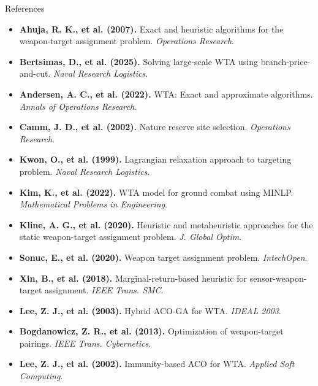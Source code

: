 \documentclass[aspectratio=169,10pt]{beamer}
\begin{document}

\begin{frame}[shrink=5]{References}
  \tiny
  \raggedright
  \begin{itemize}\setlength\itemsep{4pt}
    \item[\hypertarget{ref1}{[1]}] \textbf{Ahuja, R. K., et al. (2007).} Exact and heuristic algorithms for the weapon-target assignment problem. \textit{Operations Research}.
    \item[\hypertarget{ref2}{[2]}] \textbf{Bertsimas, D., et al. (2025).} Solving large-scale WTA using branch-price-and-cut. \textit{Naval Research Logistics}.
    \item[\hypertarget{ref3}{[3]}] \textbf{Andersen, A. C., et al. (2022).} WTA: Exact and approximate algorithms. \textit{Annals of Operations Research}.
    \item[\hypertarget{ref4}{[4]}] \textbf{Camm, J. D., et al. (2002).} Nature reserve site selection. \textit{Operations Research}.
    \item[\hypertarget{ref5}{[5]}] \textbf{Kwon, O., et al. (1999).} Lagrangian relaxation approach to targeting problem. \textit{Naval Research Logistics}.
    \item[\hypertarget{ref6}{[6]}] \textbf{Kim, K., et al. (2022).} WTA model for ground combat using MINLP. \textit{Mathematical Problems in Engineering}.
    \item[\hypertarget{ref7}{[7]}] \textbf{Kline, A. G., et al. (2020).} Heuristic and metaheuristic approaches for the static weapon-target assignment problem. \textit{J. Global Optim}.
    \item[\hypertarget{ref8}{[8]}] \textbf{Sonuc, E., et al. (2020).} Weapon target assignment problem. \textit{IntechOpen}.
    \item[\hypertarget{ref9}{[9]}] \textbf{Xin, B., et al. (2018).} Marginal-return-based heuristic for sensor-weapon-target assignment. \textit{IEEE Trans. SMC}.
    \item[\hypertarget{ref10}{[10]}] \textbf{Lee, Z. J., et al. (2003).} Hybrid ACO-GA for WTA. \textit{IDEAL 2003}.
    \item[\hypertarget{ref11}{[11]}] \textbf{Bogdanowicz, Z. R., et al. (2013).} Optimization of weapon-target pairings. \textit{IEEE Trans. Cybernetics}.
    \item[\hypertarget{ref12}{[12]}] \textbf{Lee, Z. J., et al. (2002).} Immunity-based ACO for WTA. \textit{Applied Soft Computing}.

\end{itemize}
\end{frame}
\end{document}
